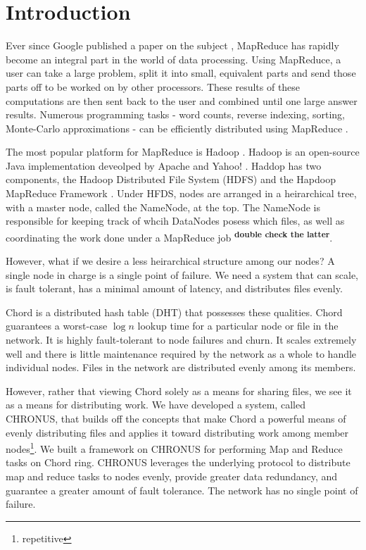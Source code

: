 \documentclass[conference, compsocconf, letterpaper]{IEEEtran}
\begin{document}
\section{Introduction}

Ever since Google published a paper on the subject \cite{mapreduce}, MapReduce has rapidly become an integral part in the world of data processing.  Using MapReduce, a user can take a large problem, split it into small, equivalent parts and send those parts off to be worked on by other processors.  These results of these computations are then sent back to the user and combined until one large answer results.  Numerous programming tasks - word counts, reverse indexing, sorting, Monte-Carlo approximations - can be efficiently distributed using MapReduce \cite{mapreduce}.

The most popular platform for MapReduce is Hadoop \cite{Hadoop}. Hadoop is an open-source Java implementation deveolped by Apache and Yahoo! \cite{pavlo2009comparison}.  Haddop has two components, the Hadoop Distributed File System (HDFS) and the Hapdoop MapReduce Framework \cite{mrsurvey}.  Under HFDS, nodes are arranged in a heirarchical tree, with a master node, called the NameNode, at the top.  The NameNode is responsible for keeping track of whcih DataNodes posess which files, as well as coordinating the work done under a MapReduce job \textsuperscript{\textbf{double check the latter}}. 
 
However, what if we desire a less heirarchical structure among our nodes?  A single node in charge is a single point of failure.  We need a system that can scale, is fault tolerant, has a minimal amount of latency, and distributes files evenly. 

Chord \cite{Chord} is a distributed hash table (DHT) that possesses these qualities.  Chord guarantees a worst-case $\log n$ lookup time for a particular node or file in the network. It is highly fault-tolerant to node failures and churn.  It scales extremely well and there is little maintenance required by the network as a whole to handle individual nodes.  Files in the network are distributed evenly among its members.
 
However, rather that viewing Chord solely as a means for sharing files, we see it as a means for distributing work.  We have developed a system, called CHRONUS, that builds off the concepts that make Chord a powerful means of evenly distributing files and applies it toward distributing work among member nodes\footnote{repetitive}.  We built a framework on CHRONUS for performing Map and Reduce tasks on Chord ring.  CHRONUS leverages the underlying protocol to distribute map and reduce tasks to nodes evenly, provide greater data redundancy, and guarantee a greater amount of fault tolerance.  The network has no single point of failure.
\end{document}
